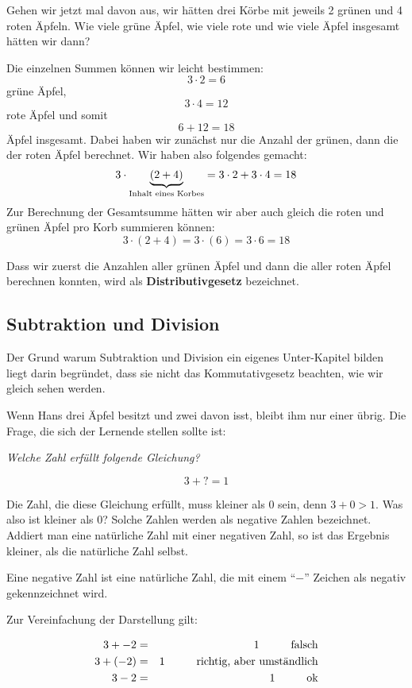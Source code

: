 Gehen wir jetzt mal davon aus, wir hätten drei Körbe mit jeweils 2 grünen und 4 roten Äpfeln. Wie viele grüne Äpfel, wie viele rote und wie viele Äpfel insgesamt hätten wir dann?

Die einzelnen Summen können wir leicht bestimmen: 
\[3\cdot 2 = 6\]
grüne Äpfel,
\[3\cdot 4 = 12 \]
rote Äpfel und somit
\[6+12 = 18\]
Äpfel insgesamt. Dabei haben wir zunächst nur die Anzahl der grünen, dann die der roten Äpfel berechnet. Wir haben also folgendes gemacht:
\[3\cdot \underbrace{(2+4)}_{\textnormal{Inhalt eines Korbes}} = 3\cdot 2 + 3\cdot 4 = 18\]
Zur Berechnung der Gesamtsumme hätten wir aber auch gleich die roten und grünen Äpfel pro Korb summieren können:
\[3\cdot (2+4) = 3\cdot (6) = 3\cdot 6 = 18 \]

Dass wir zuerst die Anzahlen aller grünen Äpfel und dann die aller roten Äpfel berechnen konnten, wird als  \textbf{Distributivgesetz} bezeichnet.

\subsection{Subtraktion und Division}

Der Grund warum Subtraktion und Division ein eigenes Unter-Kapitel bilden liegt darin begründet, dass sie nicht das Kommutativgesetz beachten, wie wir gleich sehen werden.

Wenn Hans drei Äpfel besitzt und zwei davon isst, bleibt ihm nur einer übrig. Die Frage, die sich der Lernende stellen sollte ist:

\textsl{Welche Zahl erfüllt folgende Gleichung?}

\[3 + ? = 1\]

Die Zahl, die diese Gleichung erfüllt, muss kleiner als 0 sein, denn $3+0 > 1$. Was also ist kleiner als 0? Solche Zahlen werden als negative Zahlen bezeichnet. Addiert man eine natürliche Zahl mit einer negativen Zahl, so ist das Ergebnis kleiner, als die natürliche Zahl selbst. 

\begin{definition}
Eine negative Zahl ist eine natürliche Zahl, die mit einem "`$-$"' Zeichen als negativ gekennzeichnet wird. 
\end{definition}

Zur Vereinfachung der Darstellung gilt:

\begin{eqnarray*}
3 + -2 &=& 1 \hspace{1cm}\textnormal{falsch}\\
3 + (-2) &=& 1 \hspace{1cm}\textnormal{richtig, aber umständlich}\\
3 - 2  &=& 1 \hspace{1cm}\textnormal{ok}
\end{eqnarray*}

